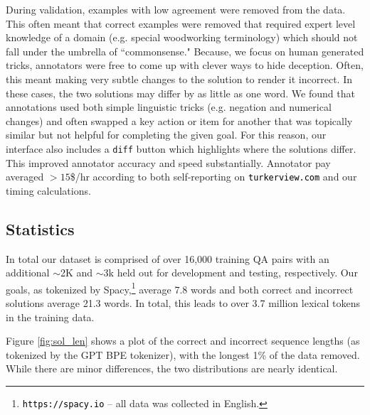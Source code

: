  During validation, examples with low agreement were removed from the data. This often meant that correct examples were removed that required expert level knowledge of a domain (e.g. special woodworking terminology) which should not fall under the umbrella of ``commonsense." Because, we focus on human generated tricks, annotators were free to come up with clever ways to hide deception.  Often, this meant making very subtle changes to the solution to render it incorrect.  In these cases, the two solutions may differ by as little as one word. We found that annotations used both simple linguistic tricks (e.g. negation and numerical changes) and often swapped a key action or item for another that was topically similar but not helpful for completing the given goal. For this reason, our interface also includes a \texttt{diff} button which highlights where the solutions differ.  This improved annotator accuracy and speed substantially.  Annotator pay averaged $>\!15$\$/hr according to both self-reporting on \texttt{\textcolor{black}{turkerview.com}} and our timing calculations.

\subsection{Statistics}
In total our dataset is comprised of over 16,000 training QA pairs with an additional $\sim$2K and $\sim$3k held out for development and testing, respectively.  Our goals, as tokenized by Spacy,\footnote{\texttt{\textcolor{black}{https://spacy.io}} --  all data was collected in English.} average 7.8 words and both correct and incorrect solutions average 21.3 words.  In total, this leads to over 3.7 million lexical tokens in the training data. 

Figure \ref{fig:sol_len} shows a plot of the correct and incorrect sequence lengths (as tokenized by the GPT BPE tokenizer), with the longest 1\% of the data removed.  While there are minor differences, the two distributions are nearly identical.

